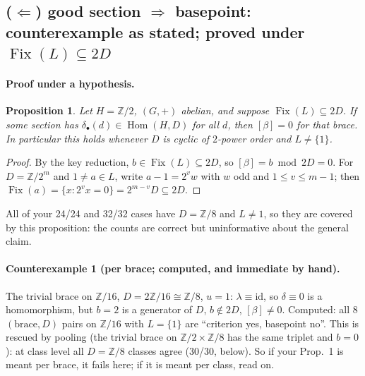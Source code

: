 \documentclass[11pt]{article}
\newcommand{\Z}{\mathbb{Z}}
\newcommand{\Fix}{\operatorname{Fix}}
\newcommand{\Hom}{\operatorname{Hom}}
\newtheorem*{prop*}{Proposition}
\begin{document}
\subsection*{($\Leftarrow$) good section $\Rightarrow$ basepoint: \textbf{counterexample} as stated; \textbf{proved} under $\Fix(L)\subseteq2D$}

\paragraph{Proof under a hypothesis.}
\begin{prop*}
Let $H=\Z/2$, $(G,+)$ abelian, and suppose $\Fix(L)\subseteq 2D$. If some section has
$\delta_\bullet(d)\in\Hom(H,D)$ for all $d$, then $[\beta]=0$ for that brace.
In particular this holds whenever $D$ is cyclic of $2$-power order and $L\neq\{1\}$.
\end{prop*}
\begin{proof}
By the key reduction, $b\in\Fix(L)\subseteq 2D$, so $[\beta]=b\bmod 2D=0$. For
$D=\Z/2^m$ and $1\neq a\in L$, write $a-1=2^v w$ with $w$ odd and $1\le v\le m-1$; then
$\Fix(a)=\{x:2^v x=0\}=2^{m-v}D\subseteq 2D$.
\end{proof}
All of your 24/24 and 32/32 cases have $D=\Z/8$ and $L\neq1$, so they are covered by this
proposition: the counts are correct but uninformative about the general claim.

\paragraph{Counterexample 1 (per brace; computed, and immediate by hand).} The trivial brace
on $\Z/16$, $D=2\Z/16\cong\Z/8$, $u=1$: $\lambda\equiv\mathrm{id}$, so $\delta\equiv0$ is a
homomorphism, but $b=2$ is a generator of $D$, $b\notin2D$, $[\beta]\neq0$. Computed: all
8 $(\text{brace},D)$ pairs on $\Z/16$ with $L=\{1\}$ are ``criterion yes, basepoint no''.
This is rescued by pooling (the trivial brace on $\Z/2\times\Z/8$ has the same triplet and
$b=0$): at class level all $D=\Z/8$ classes agree (30/30, below). So if your Prop.~1 is
meant per brace, it fails here; if it is meant per class, read on.
\end{document}
